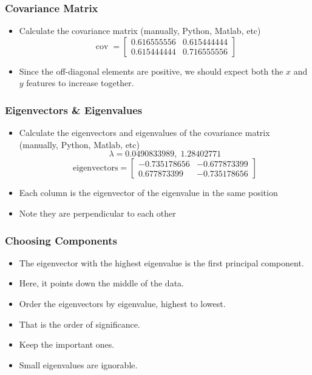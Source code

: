 \begin{frame}[fragile] \frametitle{Covariance Matrix}
\begin{itemize}
\item Calculate the covariance matrix (manually, Python, Matlab, etc)
\[
\operatorname{cov} =
\begin{bmatrix}
0.616555556 & 0.615444444 \\
0.615444444 & 0.716555556
\end{bmatrix}
\]
\item Since the off-diagonal elements are positive, we should expect both the $x$ and $y$ features to increase together.
\end{itemize}
\end{frame}

\begin{frame}[fragile] \frametitle{Eigenvectors \& Eigenvalues}
\begin{itemize}
\item Calculate the eigenvectors and eigenvalues of the covariance matrix (manually, Python, Matlab, etc)
\[
\lambda = 0.0490833989, \; 1.28402771
\]
\[
\text{eigenvectors} =
\begin{bmatrix}
-0.735178656 & -0.677873399 \\
0.677873399 & -0.735178656
\end{bmatrix}
\]
\item Each column is the eigenvector of the eigenvalue in the same position
\item Note they are perpendicular to each other
\end{itemize}
\end{frame}

\begin{frame}[fragile] \frametitle{Choosing Components}
\begin{itemize}
\item The eigenvector with the highest eigenvalue is the first principal component.
\item Here, it points down the middle of the data.
\item Order the eigenvectors by eigenvalue, highest to lowest.
\item That is the order of significance.
\item Keep the important ones.
\item Small eigenvalues are ignorable.
\end{itemize}
\end{frame}

